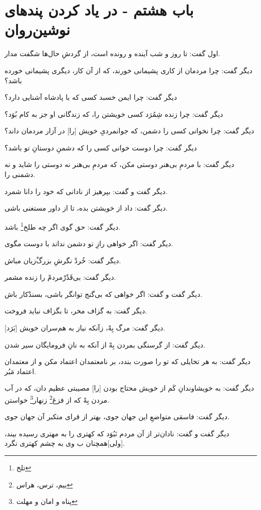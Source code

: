 \section*{باب هشتم - 
در ياد كردن پندهاى نوشين‌روان}


اول گفت: تا روز و شب آينده‌ و‌ رونده است، از گردشِ حال‌ها شگفت مدار.

ديگر گفت: چرا مردمان از كارى پشيمانى خورند، كه از آن كار، ديگرى پشيمانى خورده باشد؟

ديگر گفت: چرا ايمن خسبد كسى كه با پادشاه آشنايى دارد؟

ديگر گفت: چرا زنده شِمُرَد كسى خويشتن را، كه زندگانى او جز به كام بُوَد؟

ديگر گفت: چرا نخوانى كسى را دشمن، كه جوانمردىِ خويش [را] در آزار مردمان داند؟

ديگر گفت: چرا دوست خوانى كسى را كه دشمنِ دوستانِ تو باشد؟

ديگر گفت: با مردمِ بى‌هنر دوستى مكن، كه مردمِ بى‌هنر نه دوستى را شايد و نه دشمنى را.

ديگر گفت و گفت: بپرهيز از نادانى كه خود را دانا شمرد.

ديگر گفت: داد از خويشتن بده، تا از داور مستغنى باشى.

ديگر گفت: حق گوى اگر چه طلخ\footnote{تلخ} باشد.

ديگر گفت: اگر خواهى رازِ تو دشمن نداند با دوست مگوى.

ديگر گفت: خُردْ نگرشِ بزرگْ‌زيان مباش.

ديگر گفت: بى‌قَدْرْ‌مردمْ را زنده مشمر.

ديگر گفت و گفت: اگر خواهى كه بى‌گنج توانگر باشى، بسند‌ْكار باش.

ديگر گفت: به گزاف مخر، تا بگزاف نبايد فروخت.

ديگر گفت: مرگ بِهْ، زآنكه نياز به هم‌سران خويش [بَرَد].

ديگر گفت: از گرسنگى بمردن بِهْ از آنكه به نانِ فرومايگان سير شدن.

ديگر گفت: به هر تخايلى كه تو را صورت بندد، بر نامعتمدان اعتماد مكن و از معتمدان اعتماد مَبُر.

ديگر گفت: به خويشاوندانِ کَم‌ از خويش محتاج بودن [را] مصيبتى عظيم دان، كه در آب مردن بِهْ كه از فزغ\footnote{بیم، ترس، هراس} زنهار\footnote{پناه و امان و مهلت} خواستن.

ديگر گفت: فاسقى متواضعِ اين جهان جوى، بهتر از قراى متكبر آن جهان جوى.

ديگر گفت و گفت: نادان‌تر از آن مردم نَبُوَد كه كهترى را به مهترى رسيده بيند، [ولی]همچنان ب وی به چشم كهترى نگرد.

